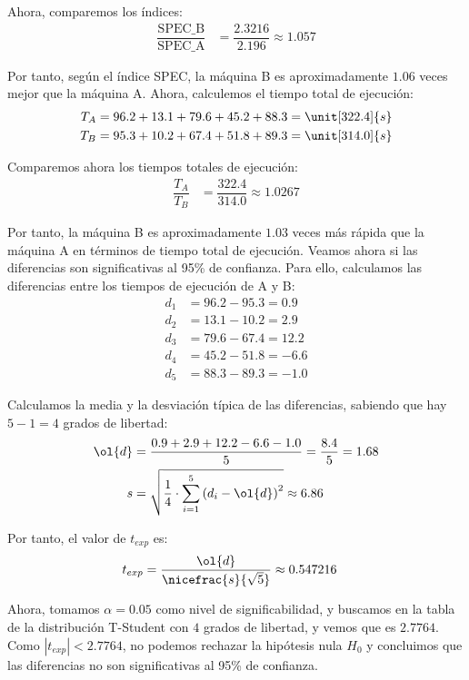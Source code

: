 \begin{ejercicio}
Ahora, comparemos los índices:
\begin{align*}
    \dfrac{\text{SPEC\_B}}{\text{SPEC\_A}} &= \dfrac{2.3216}{2.196} \approx 1.057
\end{align*}

Por tanto, según el índice SPEC, la máquina B es aproximadamente $1.06$ veces mejor que la máquina A.
Ahora, calculemos el tiempo total de ejecución:
\begin{align*}
    T_A &= 96.2 + 13.1 + 79.6 + 45.2 + 88.3 = \unit[322.4]{s}\\
    T_B &= 95.3 + 10.2 + 67.4 + 51.8 + 89.3 = \unit[314.0]{s}
\end{align*}

Comparemos ahora los tiempos totales de ejecución:
\begin{align*}
    \dfrac{T_A}{T_B} &= \dfrac{322.4}{314.0} \approx 1.0267
\end{align*}

Por tanto, la máquina B es aproximadamente $1.03$ veces más rápida que la máquina A en términos de tiempo total de ejecución. Veamos ahora si las diferencias son significativas al 95\% de confianza. Para ello, calculamos las diferencias entre los tiempos de ejecución de A y B:
\begin{align*}
    d_1 &= 96.2 - 95.3 = 0.9\\
    d_2 &= 13.1 - 10.2 = 2.9\\
    d_3 &= 79.6 - 67.4 = 12.2\\
    d_4 &= 45.2 - 51.8 = -6.6\\
    d_5 &= 88.3 - 89.3 = -1.0
\end{align*}

Calculamos la media y la desviación típica de las diferencias, sabiendo que hay $5-1=4$ grados de libertad:
\begin{align*}
    \ol{d} &= \dfrac{0.9 + 2.9 + 12.2 - 6.6 - 1.0}{5} = \dfrac{8.4}{5} = 1.68\\
    s &= \sqrt{\dfrac{1}{4}\cdot \sum_{i=1}^5 \left(d_i-\ol{d}\right)^2} \approx 6.86
\end{align*}

Por tanto, el valor de $t_{exp}$ es:
\begin{align*}
    t_{exp} &= \dfrac{\ol{d}}{\nicefrac{s}{\sqrt{5}}}  \approx 0.547216
\end{align*}

Ahora, tomamos $\alpha=0.05$ como nivel de significabilidad, y buscamos en la tabla de la distribución T-Student con $4$ grados de libertad, y vemos que es $2.7764$. Como $|t_{exp}| < 2.7764$, no podemos rechazar la hipótesis nula $H_0$ y concluimos que las diferencias no son significativas al 95\% de confianza.

\end{ejercicio}
